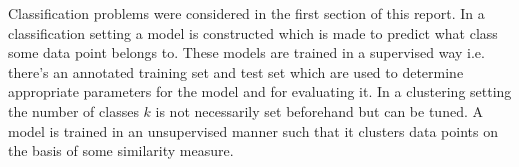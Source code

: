 
Classification problems were considered in the first section of this report. In a classification setting a model is constructed which is made to predict what class some data point belongs to. These models are trained in a supervised way i.e. there's an annotated training set and test set which are used to determine appropriate parameters for the model and for evaluating it. In a clustering setting the number of classes $k$ is not necessarily set beforehand but can be tuned. A model is trained in an unsupervised manner such that it clusters data points on the basis of some similarity measure. 

\begin{figure}[h]
\centering
%
\quad
{}
\end{figure}

